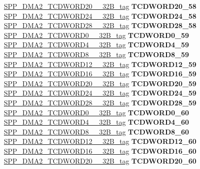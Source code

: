 \begin{DoxyCompactItemize}
\begin{tabbing}
\>\>\mbox{\hyperlink{unionSPP__DMA2__TCDWORD20____32B__tag}{SPP\_DMA2\_TCDWORD20\_\_32B\_tag}} {\bfseries TCDWORD20\_58}\\
\>\>\mbox{\hyperlink{unionSPP__DMA2__TCDWORD24____32B__tag}{SPP\_DMA2\_TCDWORD24\_\_32B\_tag}} {\bfseries TCDWORD24\_58}\\
\>\>\mbox{\hyperlink{unionSPP__DMA2__TCDWORD28____32B__tag}{SPP\_DMA2\_TCDWORD28\_\_32B\_tag}} {\bfseries TCDWORD28\_58}\\
\>\>\mbox{\hyperlink{unionSPP__DMA2__TCDWORD0____32B__tag}{SPP\_DMA2\_TCDWORD0\_\_32B\_tag}} {\bfseries TCDWORD0\_59}\\
\>\>\mbox{\hyperlink{unionSPP__DMA2__TCDWORD4____32B__tag}{SPP\_DMA2\_TCDWORD4\_\_32B\_tag}} {\bfseries TCDWORD4\_59}\\
\>\>\mbox{\hyperlink{unionSPP__DMA2__TCDWORD8____32B__tag}{SPP\_DMA2\_TCDWORD8\_\_32B\_tag}} {\bfseries TCDWORD8\_59}\\
\>\>\mbox{\hyperlink{unionSPP__DMA2__TCDWORD12____32B__tag}{SPP\_DMA2\_TCDWORD12\_\_32B\_tag}} {\bfseries TCDWORD12\_59}\\
\>\>\mbox{\hyperlink{unionSPP__DMA2__TCDWORD16____32B__tag}{SPP\_DMA2\_TCDWORD16\_\_32B\_tag}} {\bfseries TCDWORD16\_59}\\
\>\>\mbox{\hyperlink{unionSPP__DMA2__TCDWORD20____32B__tag}{SPP\_DMA2\_TCDWORD20\_\_32B\_tag}} {\bfseries TCDWORD20\_59}\\
\>\>\mbox{\hyperlink{unionSPP__DMA2__TCDWORD24____32B__tag}{SPP\_DMA2\_TCDWORD24\_\_32B\_tag}} {\bfseries TCDWORD24\_59}\\
\>\>\mbox{\hyperlink{unionSPP__DMA2__TCDWORD28____32B__tag}{SPP\_DMA2\_TCDWORD28\_\_32B\_tag}} {\bfseries TCDWORD28\_59}\\
\>\>\mbox{\hyperlink{unionSPP__DMA2__TCDWORD0____32B__tag}{SPP\_DMA2\_TCDWORD0\_\_32B\_tag}} {\bfseries TCDWORD0\_60}\\
\>\>\mbox{\hyperlink{unionSPP__DMA2__TCDWORD4____32B__tag}{SPP\_DMA2\_TCDWORD4\_\_32B\_tag}} {\bfseries TCDWORD4\_60}\\
\>\>\mbox{\hyperlink{unionSPP__DMA2__TCDWORD8____32B__tag}{SPP\_DMA2\_TCDWORD8\_\_32B\_tag}} {\bfseries TCDWORD8\_60}\\
\>\>\mbox{\hyperlink{unionSPP__DMA2__TCDWORD12____32B__tag}{SPP\_DMA2\_TCDWORD12\_\_32B\_tag}} {\bfseries TCDWORD12\_60}\\
\>\>\mbox{\hyperlink{unionSPP__DMA2__TCDWORD16____32B__tag}{SPP\_DMA2\_TCDWORD16\_\_32B\_tag}} {\bfseries TCDWORD16\_60}\\
\>\>\mbox{\hyperlink{unionSPP__DMA2__TCDWORD20____32B__tag}{SPP\_DMA2\_TCDWORD20\_\_32B\_tag}} {\bfseries TCDWORD20\_60}\\

\end{tabbing}
\end{DoxyCompactItemize}
